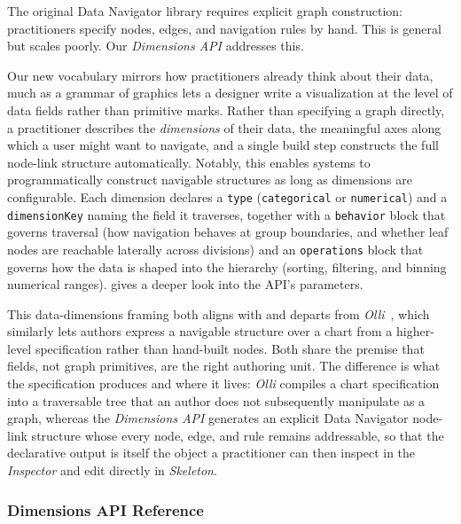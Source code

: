 \documentclass[12pt]{cmuthesis}
\begin{document}
The original Data Navigator library requires explicit graph construction: practitioners specify nodes, edges, and navigation rules by hand. This is general but scales poorly. Our \textit{Dimensions API} addresses this.

Our new vocabulary mirrors how practitioners already think about their data, much as a grammar of graphics lets a designer write a visualization at the level of data fields rather than primitive marks. Rather than specifying a graph directly, a practitioner describes the \textit{dimensions} of their data, the meaningful axes along which a user might want to navigate, and a single build step constructs the full node-link structure automatically. Notably, this enables systems to programmatically construct navigable structures as long as dimensions are configurable. Each dimension declares a \texttt{type} (\texttt{categorical} or \texttt{numerical}) and a \texttt{dimensionKey} naming the field it traverses, together with a \texttt{behavior} block that governs traversal (how navigation behaves at group boundaries, and whether leaf nodes are reachable laterally across divisions) and an \texttt{operations} block that governs how the data is shaped into the hierarchy (sorting, filtering, and binning numerical ranges).  gives a deeper look into the API's parameters.

This data-dimensions framing both aligns with and departs from \textit{Olli}~\cite{Blanco2022olli}, which similarly lets authors express a navigable structure over a chart from a higher-level specification rather than hand-built nodes. Both share the premise that fields, not graph primitives, are the right authoring unit. The difference is what the specification produces and where it lives: \textit{Olli} compiles a chart specification into a traversable tree that an author does not subsequently manipulate as a graph, whereas the \textit{Dimensions API} generates an explicit Data Navigator node-link structure whose every node, edge, and rule remains addressable, so that the declarative output is itself the object a practitioner can then inspect in the \textit{Inspector} and edit directly in \textit{Skeleton}.

\subsubsection{Dimensions API Reference}
\label{app:dimensions}
\end{document}
